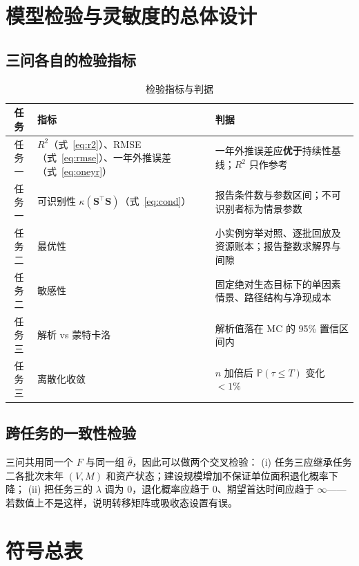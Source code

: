 \documentclass[11pt,a4paper]{ctexart}
\newcommand{\Prob}{\mathbb{P}}
\begin{document}
\section{模型检验与灵敏度的总体设计}\label{sec:check}

\subsection{三问各自的检验指标}

\begin{table}[H]\centering\small
\begin{tabularx}{\textwidth}{|c|X|X|}
\toprule
任务 & 指标 & 判据 \\
\midrule
任务一 & $R^2$（式~\eqref{eq:r2}）、RMSE（式~\eqref{eq:rmse}）、一年外推误差（式~\eqref{eq:oneyr}）
& 一年外推误差应\textbf{优于}持续性基线；$R^2$ 只作参考 \\
任务一 & 可识别性 $\kappa(\bm{S}^{\top}\bm{S})$（式~\eqref{eq:cond}）
& 报告条件数与参数区间；不可识别者标为情景参数 \\
任务二 & 最优性 & 小实例穷举对照、逐批回放及资源账本；报告整数求解界与间隙 \\
任务二 & 敏感性 & 固定绝对生态目标下的单因素情景、路径结构与净现成本 \\
任务三 & 解析 vs 蒙特卡洛 & 解析值落在 MC 的 95\% 置信区间内 \\
任务三 & 离散化收敛 & $n$ 加倍后 $\Prob(\tau\le T)$ 变化 $<1\%$ \\
\bottomrule
\end{tabularx}
\caption{检验指标与判据}\label{tab:check}
\end{table}

\subsection{跨任务的一致性检验}

三问共用同一个 $F$ 与同一组 $\hat\theta$，因此可以做两个交叉检验：
(i) 任务三应继承任务二各批次末年 $(V,M)$ 和资产状态；建设规模增加不保证单位面积退化概率下降；
(ii) 把任务三的 $\lambda$ 调为 0，退化概率应趋于 0、期望首达时间应趋于 $\infty$——
若数值上不是这样，说明转移矩阵或吸收态设置有误。

\appendix
\section{符号总表}\label{app:sym}
\end{document}
